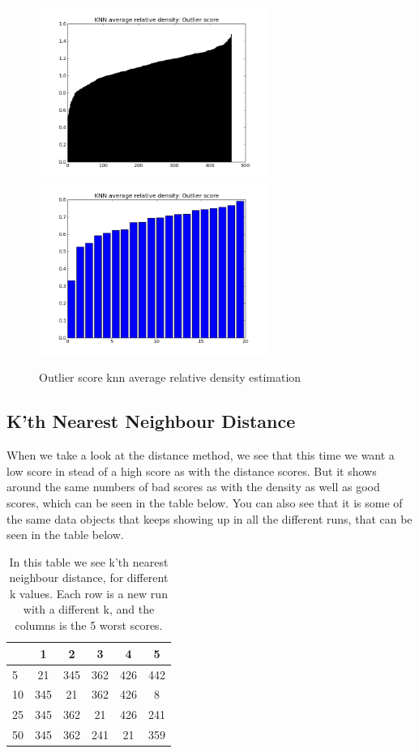 \begin{figure}[H]
\centering
\includegraphics[width=7.5cm, keepaspectratio=true]{pictures/knnAvgdensityEstimationAll.png}
\includegraphics[width=7.5cm, keepaspectratio=true]{pictures/knnAvgdensityEstimation20.png}
\vspace{-0.4cm}
\caption{\footnotesize Outlier score knn average relative density estimation}
\label{avg}
\end{figure}

\subsection{K'th Nearest Neighbour Distance}

When we take a look at the distance method, we see that this time we want a low score in stead of a high score as with the distance scores. But it shows around the same numbers of bad scores as with the density as well as good scores, which can be seen in the table below. You can also see that it is some of the same data objects that keeps showing up in all the different runs, that can be seen in the table below.
\begin{table}[H]
\begin{longtable}{lccccc}
\hline
   & 1   & 2   & 3   & 4   & 5   \\ \hline
5  & 21  & 345 & 362 & 426 & 442 \\ 
10 & 345 & 21  & 362 & 426 & 8   \\ 
25 & 345 & 362 & 21  & 426 & 241 \\
50 & 345 & 362 & 241 & 21  & 359 \\ \hline
\end{longtable}
\caption{\footnotesize In this table we see k'th nearest neighbour distance, for different k values. Each row is a new run with a different k, and the columns is the 5 worst scores.}
\end{table}


